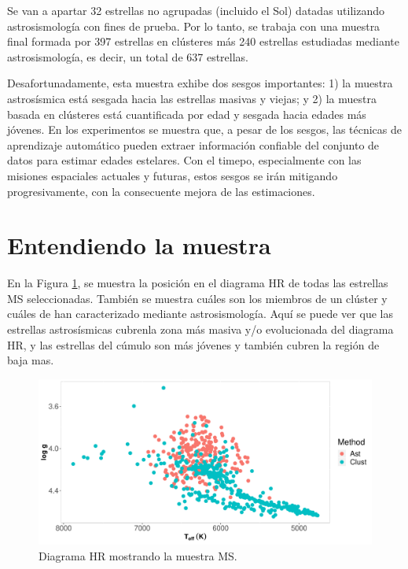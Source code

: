 Se van a apartar 32 estrellas no agrupadas (incluido el Sol) datadas utilizando astrosismología con fines de prueba. Por lo tanto, se trabaja con una muestra final formada por 397 estrellas en clústeres más 240 estrellas estudiadas mediante astrosismología, es decir, un total de 637 estrellas.

Desafortunadamente, esta muestra exhibe dos sesgos importantes: 1) la muestra astrosísmica está sesgada hacia las estrellas masivas y viejas; y 2) la muestra basada en clústeres está cuantificada por edad y sesgada hacia edades más jóvenes. En los experimentos se muestra que, a pesar de los sesgos, las técnicas de aprendizaje automático pueden extraer información confiable del conjunto de datos para estimar edades estelares. Con el timepo, especialmente con las misiones espaciales actuales y futuras, estos sesgos se irán mitigando progresivamente, con la consecuente mejora de las estimaciones.


\section{Entendiendo la muestra}

En la Figura \ref{Fig:HR_select}, se muestra la posición en el diagrama HR de todas las estrellas MS seleccionadas. También se muestra cuáles son los miembros de un clúster y cuáles de han caracterizado mediante astrosismología. Aquí se puede ver que las estrellas astrosísmicas cubrenla zona más masiva y/o evolucionada del diagrama HR, y las estrellas del cúmulo son más jóvenes y también cubren la región de baja mas.

\begin{figure}[t]
\begin{center}
\includegraphics[width=0.9\linewidth]{Figuras/sampling_MS_astro_clust_embedded.pdf}
\end{center}
\caption{Diagrama HR mostrando la muestra MS.}
 \label{Fig:HR_select}
\end{figure}


